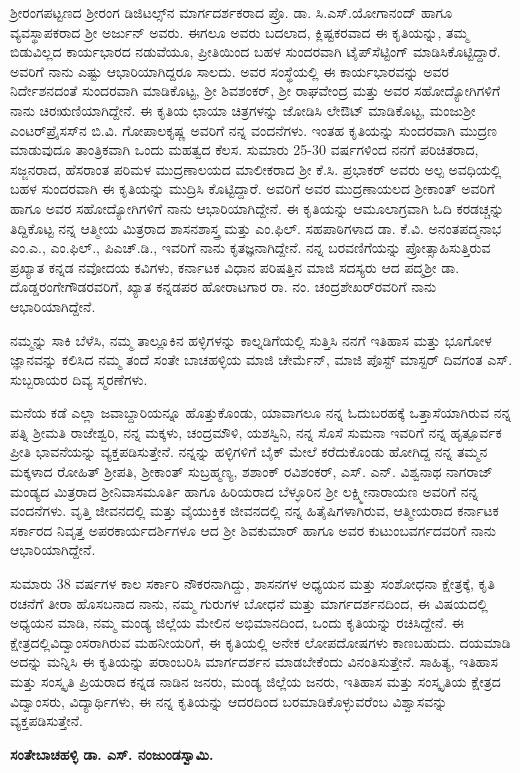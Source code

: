 ಶ‍್ರೀರಂಗಪಟ್ಟಣದ ಶ‍್ರೀರಂಗ ಡಿಜಿಟಲ್ಸ್​ನ ಮಾರ್ಗದರ್ಶಕರಾದ ಪ್ರೊ. ಡಾ. ಸಿ.ಎಸ್​.ಯೋಗಾನಂದ್​ ಹಾಗೂ ವ್ಯವಸ್ಥಾಪಕರಾದ ಶ‍್ರೀ ಅರ್ಜುನ್​ ಅವರು. ಈಗಲೂ ಅವರು ಬದಲಾದ, ಕ್ಲಿಷ್ಟಕರವಾದ ಈ ಕೃತಿಯನ್ನು, ತಮ್ಮ ಬಿಡುವಿಲ್ಲದ ಕಾರ್ಯಭಾರದ ನಡುವೆಯೂ, ಪ್ರೀತಿಯಿಂದ ಬಹಳ ಸುಂದರವಾಗಿ ಟೈಪ್​ಸೆಟ್ಟಿಂಗ್​ ಮಾಡಿಸಿಕೊಟ್ಟಿದ್ದಾರೆ. ಅವರಿಗೆ ನಾನು ಎಷ್ಟು ಆಭಾರಿ\-ಯಾಗಿದ್ದರೂ ಸಾಲದು. ಅವರ ಸಂಸ್ಥೆಯಲ್ಲಿ ಈ ಕಾರ್ಯಭಾರವನ್ನು ಅವರ ನಿರ್ದೇಶನದಂತೆ ಸುಂದರವಾಗಿ ಮಾಡಿಕೊಟ್ಟ, ಶ‍್ರೀ ಶಿವಶಂಕರ್​, ಶ‍್ರೀ ರಾಘವೇಂದ್ರ ಮತ್ತು ಅವರ ಸಹೋದ್ಯೋಗಿಗಳಿಗೆ ನಾನು ಚಿರಋಣಿಯಾಗಿದ್ದೇನೆ. ಈ ಕೃತಿಯ ಛಾಯಾ ಚಿತ್ರಗಳನ್ನು ಜೋಡಿಸಿ ಲೇಔಟ್​ ಮಾಡಿಕೊಟ್ಟ, ಮಂಜುಶ‍್ರೀ ಎಂಟರ್​\-ಪ್ರೈಸಸ್​ನ ಬಿ.ವಿ. ಗೋಪಾಲಕೃಷ್ಣ ಅವರಿಗೆ ನನ್ನ ವಂದನೆಗಳು. ಇಂತಹ ಕೃತಿಯನ್ನು ಸುಂದರವಾಗಿ ಮುದ್ರಣ ಮಾಡುವುದೂ ತಾಂತ್ರಿಕವಾಗಿ ಒಂದು ಮಹತ್ವದ ಕೆಲಸ. ಸುಮಾರು 25-30 ವರ್ಷಗಳಿಂದ ನನಗೆ ಪರಿಚಿತರಾದ, ಸಜ್ಜನರಾದ, ಹೆಸರಾಂತ ಪರಿಮಳ ಮುದ್ರಣಾಲಯದ ಮಾಲೀಕರಾದ ಶ‍್ರೀ ಕೆ.ಸಿ. ಪ್ರಭಾಕರ್​ ಅವರು ಅಲ್ಪ ಅವಧಿಯಲ್ಲಿ ಬಹಳ ಸುಂದರವಾಗಿ ಈ ಕೃತಿಯನ್ನು ಮುದ್ರಿಸಿ ಕೊಟ್ಟಿದ್ದಾರೆ. ಅವರಿಗೆ ಅವರ ಮುದ್ರಣಾಯಲದ ಶ‍್ರೀಕಾಂತ್​ ಅವರಿಗೆ ಹಾಗೂ ಅವರ ಸಹೋದ್ಯೋಗಿ\-ಗಳಿಗೆ ನಾನು ಆಭಾರಿಯಾಗಿದ್ದೇನೆ. ಈ ಕೃತಿಯನ್ನು ಆಮೂಲಾಗ್ರವಾಗಿ ಓದಿ ಕರಡಚ್ಚನ್ನು ತಿದ್ದಿಕೊಟ್ಟ ನನ್ನ ಆತ್ಮೀಯ ಮಿತ್ರರಾದ ಶಾಸನಶಾಸ್ತ್ರ ಮತ್ತು ಎಂ.ಫಿಲ್. ಸಹಪಾಠಿಗಳಾದ ಡಾ. ಕೆ.ವಿ. ಅನಂತಪದ್ಮನಾಭ ಎಂ.ಎ., ಎಂ.ಫಿಲ್., ಪಿಎಚ್.ಡಿ., ಇವರಿಗೆ ನಾನು ಕೃತಜ್ಞನಾಗಿದ್ದೇನೆ. ನನ್ನ ಬರವಣಿಗೆಯನ್ನು ಪ್ರೋತ್ಸಾಹಿಸುತ್ತಿರುವ ಪ್ರಖ್ಯಾತ ಕನ್ನಡ ನವೋದಯ ಕವಿಗಳು, ಕರ್ನಾಟಕ ವಿಧಾನ ಪರಿಷತ್ತಿನ ಮಾಜಿ ಸದಸ್ಯರು ಆದ ಪದ್ಮಶ‍್ರೀ ಡಾ. ದೊಡ್ಡರಂಗೇಗೌಡರವರಿಗೆ, ಖ್ಯಾತ ಕನ್ನಡಪರ ಹೋರಾಟಗಾರ ರಾ. ನಂ. ಚಂದ್ರಶೇಖರ್‌ರವರಿಗೆ ನಾನು ಆಭಾರಿಯಾಗಿದ್ದೇನೆ.

ನಮ್ಮನ್ನು ಸಾಕಿ ಬೆಳೆಸಿ, ನಮ್ಮ ತಾಲ್ಲೂಕಿನ ಹಳ್ಳಿಗಳನ್ನು ಕಾಲ್ನಡಿಗೆಯಲ್ಲಿ ಸುತ್ತಿಸಿ ನನಗೆ ಇತಿಹಾಸ ಮತ್ತು ಭೂಗೋಳ ಜ್ಞಾನವನ್ನು ಕಲಿಸಿದ ನಮ್ಮ ತಂದೆ ಸಂತೇ ಬಾಚಹಳ್ಳಿಯ ಮಾಜಿ ಚೇರ್ಮೆನ್, ಮಾಜಿ ಪೊಸ್ಟ್ ಮಾಸ್ಟರ್ ದಿವಗಂತ ಎಸ್. ಸುಬ್ಬರಾಯರ ದಿವ್ಯ ಸ್ಮರಣೆಗಳು.

ಮನೆಯ ಕಡೆ ಎಲ್ಲಾ ಜವಾಬ್ದಾರಿಯನ್ನೂ ಹೊತ್ತುಕೊಂಡು, ಯಾವಾಗಲೂ ನನ್ನ ಓದುಬರಹಕ್ಕೆ ಒತ್ತಾಸೆಯಾಗಿರುವ ನನ್ನ ಪತ್ನಿ ಶ‍್ರೀಮತಿ ರಾಜೇಶ್ವರಿ, ನನ್ನ ಮಕ್ಕಳು, ಚಂದ್ರಮೌಳಿ, ಯಶಸ್ವಿನಿ, ನನ್ನ ಸೊಸೆ ಸುಮನಾ ಇವರಿಗೆ ನನ್ನ ಹೃತ್ಪೂರ್ವಕ ಪ್ರೀತಿ ಭಾವನೆಯನ್ನು ವ್ಯಕ್ತಪಡಿಸುತ್ತೇನೆ. ನನ್ನನ್ನು ಹಳ್ಳಿಗಳಿಗೆ ಬೈಕ್​ ಮೇಲೆ ಕರೆದುಕೊಂಡು ಹೋಗಿದ್ದ ನನ್ನ ತಮ್ಮನ ಮಕ್ಕಳಾದ ರೋಹಿತ್​ ಶ‍್ರೀಪತಿ, ಶ‍್ರೀಕಾಂತ್​ ಸುಬ್ರಹ್ಮಣ್ಯ, ಶಶಾಂಕ್ ರವಿಶಂಕರ್, ಎಸ್. ಎನ್. ವಿಶ್ವನಾಥ ನಾಗರಾಜ್ ಮಂಡ್ಯದ ಮಿತ್ರರಾದ ಶ‍್ರೀನಿವಾಸಮೂರ್ತಿ ಹಾಗೂ ಹಿರಿಯರಾದ ಬೆಳ್ಳೂರಿನ ಶ‍್ರೀ ಲಕ್ಷ್ಮೀನಾರಾಯಣ ಅವರಿಗೆ ನನ್ನ ವಂದನೆಗಳು. ವೃತ್ತಿ ಜೀವನದಲ್ಲಿ ಮತ್ತು ವೈಯುಕ್ತಿಕ ಜೀವನದಲ್ಲಿ ನನ್ನ ಹಿತೈಷಿಗಳಾಗಿರುವ, ಆತ್ಮೀಯರಾದ ಕರ್ನಾಟಕ ಸರ್ಕಾರದ ನಿವೃತ್ತ ಅಪರಕಾರ್ಯದರ್ಶಿಗಳೂ ಆದ ಶ‍್ರೀ ಶಿವಕುಮಾರ್ ಹಾಗೂ ಅವರ ಕುಟುಂಬವರ್ಗದವರಿಗೆ ನಾನು ಆಭಾರಿಯಾಗಿದ್ದೇನೆ.

ಸುಮಾರು 38 ವರ್ಷಗಳ ಕಾಲ ಸರ್ಕಾರಿ ನೌಕರನಾಗಿದ್ದು, ಶಾಸನಗಳ ಅಧ್ಯಯನ ಮತ್ತು ಸಂಶೋಧನಾ ಕ್ಷೇತ್ರಕ್ಕೆ, ಕೃತಿ ರಚನೆಗೆ ತೀರಾ ಹೊಸಬನಾದ ನಾನು, ನಮ್ಮ ಗುರುಗಳ ಬೋಧನೆ ಮತ್ತು ಮಾರ್ಗದರ್ಶನದಿಂದ, ಈ ವಿಷಯದಲ್ಲಿ ಅಧ್ಯಯನ ಮಾಡಿ, ನಮ್ಮ ಮಂಡ್ಯ ಜಿಲ್ಲೆಯ ಮೇಲಿನ ಅಭಿಮಾನದಿಂದ, ಒಂದು ಕೃತಿಯನ್ನು ರಚಿಸಿದ್ದೇನೆ. ಈ ಕ್ಷೇತ್ರದಲ್ಲಿ\break ವಿದ್ವಾಂಸರಾಗಿರುವ ಮಹನೀಯರಿಗೆ, ಈ ಕೃತಿಯಲ್ಲಿ ಅನೇಕ ಲೋಪದೋಷಗಳು ಕಾಣಬಹುದು. ದಯಮಾಡಿ ಅದನ್ನು ಮನ್ನಿಸಿ ಈ ಕೃತಿಯನ್ನು ಪರಾಂಬರಿಸಿ ಮಾರ್ಗದರ್ಶನ ಮಾಡಬೇಕೆಂದು ವಿನಂತಿಸುತ್ತೇನೆ. ಸಾಹಿತ್ಯ, ಇತಿಹಾಸ ಮತ್ತು ಸಂಸ್ಕೃತಿ ಪ್ರಿಯರಾದ ಕನ್ನಡ ನಾಡಿನ ಜನರು, ಮಂಡ್ಯ ಜಿಲ್ಲೆಯ ಜನರು, ಇತಿಹಾಸ ಮತ್ತು ಸಂಸ್ಕೃತಿಯ ಕ್ಷೇತ್ರದ ವಿದ್ವಾಂಸರು, ವಿದ್ಯಾರ್ಥಿಗಳು, ಈ ನನ್ನ ಕೃತಿಯನ್ನು ಆದರದಿಂದ ಬರಮಾಡಿಕೊಳ್ಳುವರೆಂಬ ವಿಶ್ವಾಸವನ್ನು ವ್ಯಕ್ತಪಡಿಸುತ್ತೇನೆ.

\begin{flushright}
\textbf{ಸಂತೇಬಾಚಹಳ್ಳಿ ಡಾ. ಎಸ್​. ನಂಜುಂಡಸ್ವಾಮಿ.}
\end{flushright}

